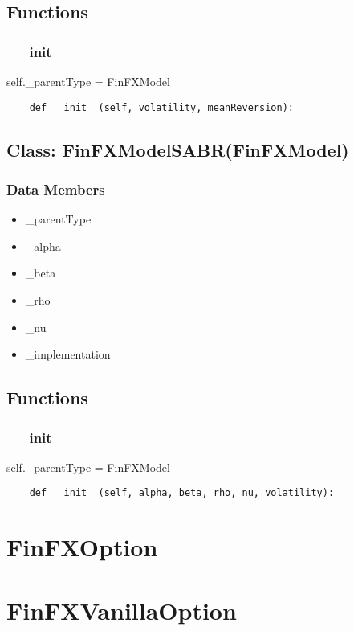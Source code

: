 \documentclass[twoside,11pt]{book}
\begin{document}
\subsection*{Functions}

\subsubsection*{{\bf \_\_init\_\_}}
self.\_parentType = FinFXModel 

\begin{lstlisting}
    def __init__(self, volatility, meanReversion):
\end{lstlisting}

\subsection*{Class: FinFXModelSABR(FinFXModel)}


\subsubsection*{Data Members}
\begin{itemize}
\item{\_parentType}
\item{\_alpha}
\item{\_beta}
\item{\_rho}
\item{\_nu}
\item{\_implementation}
\end{itemize}

\subsection*{Functions}

\subsubsection*{{\bf \_\_init\_\_}}
self.\_parentType = FinFXModel 

\begin{lstlisting}
    def __init__(self, alpha, beta, rho, nu, volatility):
\end{lstlisting}

\newpage
\section{FinFXOption}

\newpage
\section{FinFXVanillaOption}
\end{document}
